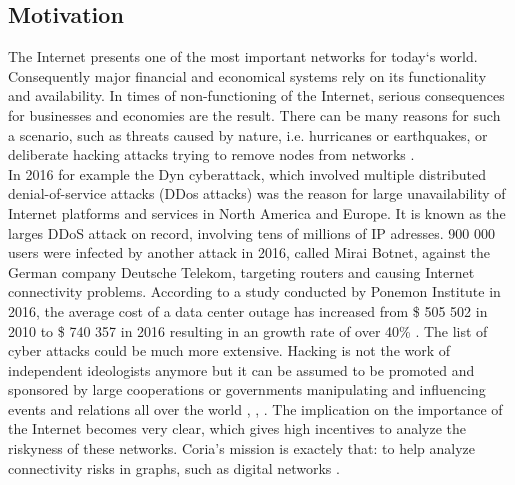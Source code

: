\documentclass[conference, 11pt]{IEEEtran}
\begin{document}
\subsection{Motivation}
The Internet presents one of the most important networks for today‘s world. Consequently major financial and economical systems rely on its functionality and availability. In times of non-functioning of the Internet, serious consequences for businesses and economies are the result. There can be many reasons for such a scenario, such as threats caused by nature, i.e. hurricanes or earthquakes, or deliberate hacking attacks trying to remove nodes from networks \cite{threats}.\\ \linebreak
In 2016 for example the Dyn cyberattack, which involved multiple distributed denial-of-service attacks (DDos attacks) was the reason for large unavailability of Internet platforms and services in North America and Europe. It is known as the larges DDoS attack on record, involving tens of millions of IP adresses\cite{dyn}. 900 000 users were infected by another attack in 2016, called Mirai Botnet, against the German company Deutsche Telekom, targeting routers and causing Internet connectivity problems\cite{DT}. According to a study conducted by Ponemon Institute in 2016, the average cost of a data center outage has increased from \$ 505 502 in 2010 to \$ 740 357 in 2016 resulting in an growth rate of over 40\% \cite{Ponemon}. The list of cyber attacks could be much more extensive. Hacking is not the work of independent ideologists anymore but it can be assumed to be promoted and sponsored by large cooperations or governments manipulating and influencing events and relations all over the world \cite{cyberSponsors}, \cite{cyberSponsors2}, \cite{cyberSponsors3}. The implication on the importance of the Internet becomes very clear, which gives high incentives to analyze the riskyness of these networks. Coria's mission is exactely that: to help analyze connectivity risks in graphs, such as digital networks\cite{Coria} . \linebreak
\end{document}
